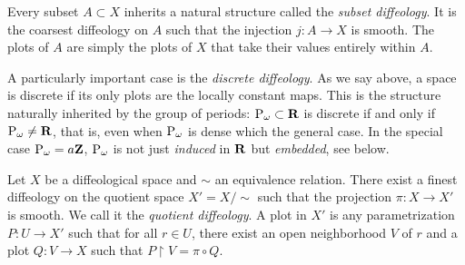   \begin{article}
    Every subset $A \subset X$ inherits a natural structure called the \emph{subset diffeology}.
    It is the coarsest diffeology on $A$ such that the injection $j : A \to X$ is smooth.
    The plots of $A$ are simply the plots of $X$ that take their values entirely within $A$.
    
    A particularly important case is the \emph{discrete diffeology}.
    As we say above,
    a space is discrete if its only plots are the locally constant maps.
    This is the structure naturally inherited by the group of periods:
    $\operatorname{P}_\omega \subset {\mathbf{R}}$ is discrete if and only if $\operatorname{P}_\omega \neq {\mathbf{R}}$,
    that is,
    even when $\operatorname{P}_\omega$ is dense which the general case.
    In the special case $\operatorname{P}_\omega = a {\mathbf{Z}}$,
    $\operatorname{P}_\omega$ is not just \emph{induced} in ${\mathbf{R}}$ but \emph{embedded},
    see below.
  \end{article}
  
  
  \begin{article}
    Let $X$ be a diffeological space and $\sim$ an equivalence relation.
    There exist a finest diffeology on the quotient space $X' = X/\!\!\sim$ such that the projection $\pi : X \to X'$ is smooth.
    We call it the \emph{quotient diffeology}.
    A plot in $X'$ is any parametrization $P : U \to X'$ such that for all $r \in U$,
    there exist an open neighborhood $V$ of $r$ and a plot $Q : V \to X$ such that $P \restriction V = \pi \circ Q$.
  \end{article}
  
